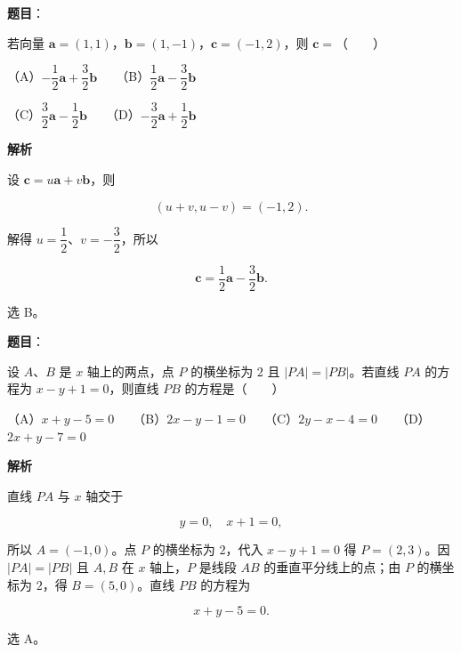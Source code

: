 \begin{answer}

\textbf{题目}：

若向量 $\boldsymbol a=(1,1)$，$\boldsymbol b=(1,-1)$，$\boldsymbol c=(-1,2)$，则 $\boldsymbol c=$\mbox{（　　）}

（A）$-\dfrac12\boldsymbol a+\dfrac32\boldsymbol b$　　（B）$\dfrac12\boldsymbol a-\dfrac32\boldsymbol b$

（C）$\dfrac32\boldsymbol a-\dfrac12\boldsymbol b$　　（D）$-\dfrac32\boldsymbol a+\dfrac12\boldsymbol b$

\textbf{解析}

设 $\boldsymbol c=u\boldsymbol a+v\boldsymbol b$，则

\nopagebreak[4]
\[
(u+v,u-v)=(-1,2).
\]

解得 $u=\dfrac12$、$v=-\dfrac32$，所以

\nopagebreak[4]
\[
\boldsymbol c=\frac12\boldsymbol a-\frac32\boldsymbol b.
\]

选 B。


\end{answer}
\begin{answer}

\textbf{题目}：

设 $A$、$B$ 是 $x$ 轴上的两点，点 $P$ 的横坐标为 $2$ 且 $|PA|=|PB|$。若直线 $PA$ 的方程为 $x-y+1=0$，则直线 $PB$ 的方程是\mbox{（　　）}

（A）$x+y-5=0$　　（B）$2x-y-1=0$　　（C）$2y-x-4=0$　　（D）$2x+y-7=0$

\textbf{解析}

直线 $PA$ 与 $x$ 轴交于

\nopagebreak[4]
\[
y=0,\quad x+1=0,
\]

所以 $A=(-1,0)$。点 $P$ 的横坐标为 $2$，代入 $x-y+1=0$ 得 $P=(2,3)$。因 $|PA|=|PB|$ 且 $A,B$ 在 $x$ 轴上，$P$ 是线段 $AB$ 的垂直平分线上的点；由 $P$ 的横坐标为 $2$，得 $B=(5,0)$。直线 $PB$ 的方程为

\nopagebreak[4]
\[
x+y-5=0.
\]

选 A。


\end{answer}
